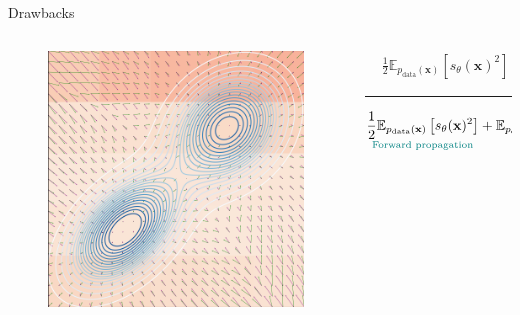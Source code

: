 \documentclass[aspectratio=169,xcolor=dvipsnames]{beamer}
\newcommand{\bx}{\mathbf{x}}
\newcommand{\nbx}{\nabla_{\bx}}
\begin{document}
\begin{frame}{Drawbacks}
\begin{columns}
\begin{column}{0.4\textwidth}
        \begin{figure}
          \centering
        \includegraphics[height=0.32\textheight]{figs/gen/score_field_training_final}
      \end{figure}
    \end{column}
    \begin{column}{0.6\textwidth}
      \centering
      \begin{align*}
        &\frac{1}{2}\mathbb{E}_{p_\text{data}(\bx)} \left[ s_\theta(\bx)^2\right] + \mathbb{E}_{p_\text{data}(\bx)}\left[\nbx s_\theta(\bx) \right]
      \end{align*}
      
      \rule{0.8\textwidth}{0.4pt}
      
      \begin{align*}
        \underset{
          \textcolor{teal}{\text{Forward propagation}}
        }{ \frac{1}{2}\mathbb{E}_{p_\text{data}(\bx)} \left[ s_\theta(\bx)^2\right]} 
        + \underset{
          \textcolor{red}{\text{Backprops}~\propto~\text{dim}(\bx)}
        }{\mathbb{E}_{p_\text{data}(\bx)}\left[\text{trace}(\nbx s_\theta(\bx)) \right]}
      \end{align*}
    \end{column}
  \end{columns}
\end{frame}
\end{document}
